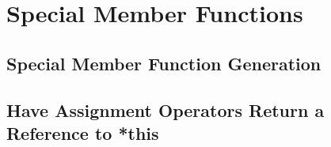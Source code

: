 \section{Special Member Functions}\label{sec:special-members}

\subsection{Special Member Function Generation}

\subsection{Have Assignment Operators Return a Reference to *this}
